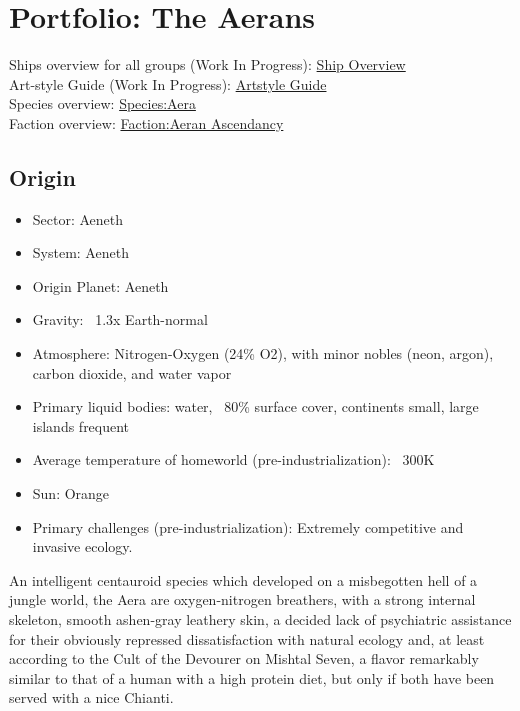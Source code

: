 \section{Portfolio: The Aerans}
Ships overview for all groups (Work In Progress): \href{http://vegastrike.sourceforge.net/wiki/Artstyle\_guide:Overview\_Guide}{Ship Overview} \\
Art-style Guide (Work In Progress): \href{http://vegastrike.sourceforge.net/wiki/Artstyle\_guide:Aeran}{Artstyle Guide} \\
Species overview: \href{http://vegastrike.sourceforge.net/wiki/Species:Aera}{Species:Aera} \\
Faction overview: \href{http://vegastrike.sourceforge.net/wiki/Faction:Aera}{Faction:Aeran Ascendancy}

\subsection{Origin}


\begin{itemize}
\item Sector: Aeneth
\item System: Aeneth
\item Origin Planet: Aeneth 

\item Gravity: ~1.3x Earth-normal

\item Atmosphere: Nitrogen-Oxygen (24\% O2), with minor nobles (neon, argon), carbon dioxide, and water vapor

\item Primary liquid bodies: water, ~80\% surface cover, continents small, large islands frequent

\item Average temperature of homeworld (pre-industrialization): ~300K

\item Sun: Orange

\item Primary challenges (pre-industrialization): Extremely competitive and invasive ecology.
\end{itemize}

 An intelligent centauroid species which developed on a misbegotten
hell of a jungle world, the Aera are oxygen-nitrogen breathers, with a
strong internal skeleton, smooth ashen-gray leathery skin, a decided
lack of psychiatric assistance for their obviously repressed
dissatisfaction with natural ecology and, at least according to the
Cult of the Devourer on Mishtal Seven, a flavor remarkably similar to
that of a human with a high protein diet, but only if both have been
served with a nice Chianti.

